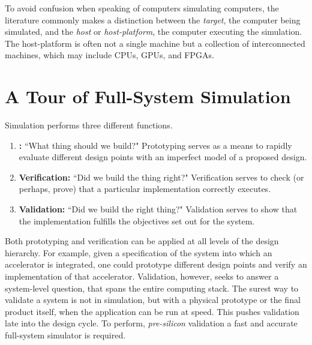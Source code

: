 To avoid confusion when speaking of computers simulating computers, the
literature commonly makes a distinction between the \emph{target}, the computer
being simulated, and the \emph{host} or \emph{host-platform}, the computer
executing the simulation. The host-platform is often not a single machine but
a collection of interconnected machines, which may include CPUs,
GPUs, and FPGAs.

\section{A Tour of Full-System Simulation}

Simulation performs three different functions.

\begin{enumerate}

    \item \textbf{:} ``What thing should we
        build?" Prototyping serves as a means to rapidly evaluate different
        design points with an imperfect model of a proposed design.

    \item \textbf{Verification:} ``Did we build the thing right?" Verification
        serves to check (or perhaps, prove) that a particular implementation
        correctly executes.

    \item \textbf{Validation:} ``Did we build the right thing?" Validation
        serves to show that the implementation fulfills the objectives set out
        for the system.

\end{enumerate}

Both prototyping and verification can be applied at all levels of the design
hierarchy.  For example, given a specification of the system into which an
accelerator is integrated, one could prototype different design points and
verify an implementation of that accelerator. Validation, however, seeks to
answer a system-level question, that spans the entire computing stack.  The
surest way to validate a system is not in simulation, but with a physical
prototype or the final product itself, when the application can be run at
speed. This pushes validation late into the design cycle. To perform,
\emph{pre-silicon} validation a fast and accurate full-system simulator is
required.


